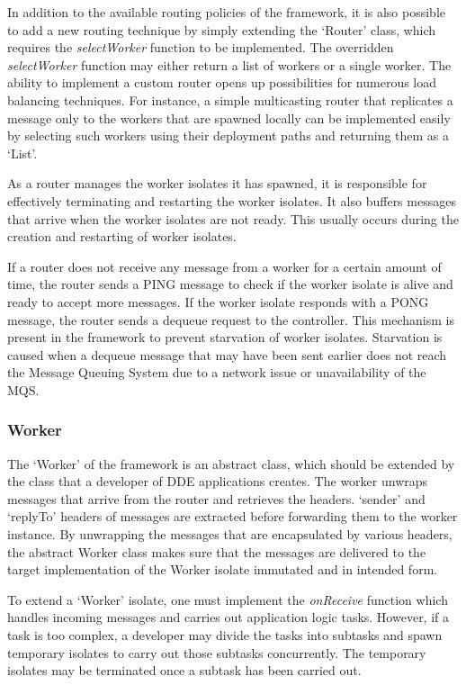     In addition to the available routing policies of the framework, it is also possible to add a new routing technique by simply extending the ‘Router’ class, which requires the \emph{selectWorker} function to be implemented. The overridden \emph{selectWorker} function may either return a list of workers or a single worker. The ability to implement a custom router opens up possibilities for numerous load balancing techniques. For instance, a simple multicasting router that replicates a message only to the workers that are spawned locally can be implemented easily by selecting such workers using their deployment paths and returning them as a ‘List’.

    As a router manages the worker isolates it has spawned, it is responsible for effectively terminating and restarting the worker isolates. It also buffers messages that arrive when the worker isolates are not ready. This usually occurs during the creation and restarting of worker isolates.

    If a router does not receive any message from a worker for a certain amount of time, the router sends a PING message to check if the worker isolate is alive and ready to accept more messages. If the worker isolate responds with a PONG message, the router sends a dequeue request to the controller. This mechanism is present in the framework to prevent starvation of worker isolates. Starvation is caused when a dequeue message that may have been sent earlier does not reach the Message Queuing System due to a network issue or unavailability of the MQS.

  \subsubsection{Worker}
  \label{subsubsec:worker}
  The ‘Worker’ of the framework is an abstract class, which should be extended by the class that a developer of DDE applications creates. The worker unwraps messages that arrive from the router and retrieves the headers. ‘sender’ and ‘replyTo’ headers of messages are extracted before forwarding them to the worker instance. By unwrapping the messages that are encapsulated by various headers, the abstract Worker class makes sure that the messages are delivered to the target implementation of the Worker isolate immutated and in intended form.

  To extend a ‘Worker’ isolate, one must implement the \emph{onReceive} function which handles incoming messages and carries out application logic tasks. However, if a task is too complex, a developer may divide the tasks into subtasks and spawn temporary isolates to carry out those subtasks concurrently. The temporary isolates may be terminated once a subtask has been carried out.


